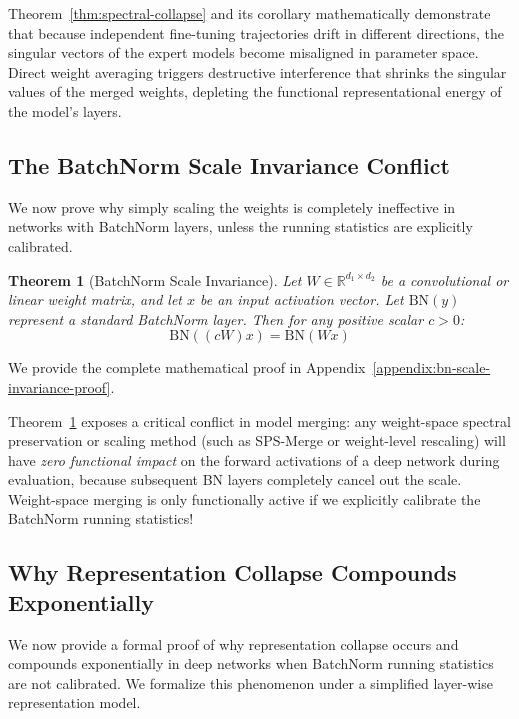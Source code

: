 \documentclass{article}
\theoremstyle{plain}
\newtheorem{theorem}{Theorem}[section]
\theoremstyle{definition}
\theoremstyle{remark}
\begin{document}
Theorem~\ref{thm:spectral-collapse} and its corollary mathematically demonstrate that because independent fine-tuning trajectories drift in different directions, the singular vectors of the expert models become misaligned in parameter space. Direct weight averaging triggers destructive interference that shrinks the singular values of the merged weights, depleting the functional representational energy of the model's layers.

\subsection{The BatchNorm Scale Invariance Conflict}
We now prove why simply scaling the weights is completely ineffective in networks with BatchNorm layers, unless the running statistics are explicitly calibrated.

\begin{theorem}[BatchNorm Scale Invariance]
\label{thm:bn-scale-invariance}
Let $W \in \mathbb{R}^{d_1 \times d_2}$ be a convolutional or linear weight matrix, and let $x$ be an input activation vector. Let $\text{BN}(y)$ represent a standard BatchNorm layer. Then for any positive scalar $c > 0$:
\begin{equation}
    \text{BN}((cW)x) = \text{BN}(Wx)
\end{equation}
\end{theorem}

We provide the complete mathematical proof in Appendix~\ref{appendix:bn-scale-invariance-proof}.

Theorem~\ref{thm:bn-scale-invariance} exposes a critical conflict in model merging: any weight-space spectral preservation or scaling method (such as SPS-Merge or weight-level rescaling) will have \textit{zero functional impact} on the forward activations of a deep network during evaluation, because subsequent BN layers completely cancel out the scale. Weight-space merging is only functionally active if we explicitly calibrate the BatchNorm running statistics!

\subsection{Why Representation Collapse Compounds Exponentially}
We now provide a formal proof of why representation collapse occurs and compounds exponentially in deep networks when BatchNorm running statistics are not calibrated. We formalize this phenomenon under a simplified layer-wise representation model.
\end{document}
